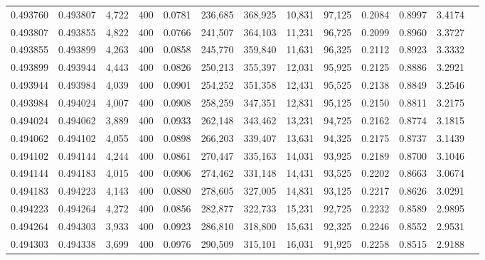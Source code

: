 \begin{tabular}{rrrrrrrrrrrrr}
0.493760 & 0.493807 &  4,722 & 400 &                                     0.0781 & 236,685 & 368,925 &  10,831 &  97,125 & 0.2084 & 0.8997 & 3.4174 \\
0.493807 & 0.493855 &  4,822 & 400 &                                     0.0766 & 241,507 & 364,103 &  11,231 &  96,725 & 0.2099 & 0.8960 & 3.3727 \\
0.493855 & 0.493899 &  4,263 & 400 &                                     0.0858 & 245,770 & 359,840 &  11,631 &  96,325 & 0.2112 & 0.8923 & 3.3332 \\
0.493899 & 0.493944 &  4,443 & 400 &                                     0.0826 & 250,213 & 355,397 &  12,031 &  95,925 & 0.2125 & 0.8886 & 3.2921 \\
0.493944 & 0.493984 &  4,039 & 400 &                                     0.0901 & 254,252 & 351,358 &  12,431 &  95,525 & 0.2138 & 0.8849 & 3.2546 \\
0.493984 & 0.494024 &  4,007 & 400 &                                     0.0908 & 258,259 & 347,351 &  12,831 &  95,125 & 0.2150 & 0.8811 & 3.2175 \\
0.494024 & 0.494062 &  3,889 & 400 &                                     0.0933 & 262,148 & 343,462 &  13,231 &  94,725 & 0.2162 & 0.8774 & 3.1815 \\
0.494062 & 0.494102 &  4,055 & 400 &                                     0.0898 & 266,203 & 339,407 &  13,631 &  94,325 & 0.2175 & 0.8737 & 3.1439 \\
0.494102 & 0.494144 &  4,244 & 400 &                                     0.0861 & 270,447 & 335,163 &  14,031 &  93,925 & 0.2189 & 0.8700 & 3.1046 \\
0.494144 & 0.494183 &  4,015 & 400 &                                     0.0906 & 274,462 & 331,148 &  14,431 &  93,525 & 0.2202 & 0.8663 & 3.0674 \\
0.494183 & 0.494223 &  4,143 & 400 &                                     0.0880 & 278,605 & 327,005 &  14,831 &  93,125 & 0.2217 & 0.8626 & 3.0291 \\
0.494223 & 0.494264 &  4,272 & 400 &                                     0.0856 & 282,877 & 322,733 &  15,231 &  92,725 & 0.2232 & 0.8589 & 2.9895 \\
0.494264 & 0.494303 &  3,933 & 400 &                                     0.0923 & 286,810 & 318,800 &  15,631 &  92,325 & 0.2246 & 0.8552 & 2.9531 \\
0.494303 & 0.494338 &  3,699 & 400 &                                     0.0976 & 290,509 & 315,101 &  16,031 &  91,925 & 0.2258 & 0.8515 & 2.9188 \\

\end{tabular}
